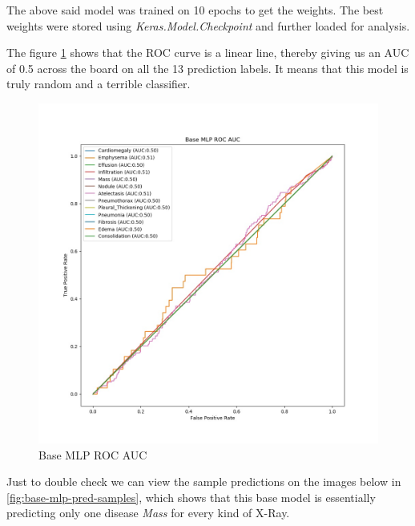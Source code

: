 \documentclass{article}
\begin{document}
    The above said model was trained on 10 epochs to get the weights. The best weights were stored using \textit{Keras.Model.Checkpoint} and further loaded for analysis. 

    The figure \ref{fig:base-mlp-roc} shows that the ROC curve is a linear line, thereby giving us an AUC of 0.5 across the board on all the 13 prediction labels. It means that this model is truly random and a terrible classifier.

    \begin{figure}
        \includegraphics[width=\linewidth]{./images/base_mlp_roc_auc.jpg}
        \caption{Base MLP ROC AUC}
        \label{fig:base-mlp-roc}
    \end{figure}

    Just to double check we can view the sample predictions on the images below in \ref{fig:base-mlp-pred-samples}, which shows that this base model is essentially predicting only one disease \textit{Mass} for every kind of X-Ray.  
\end{document}

